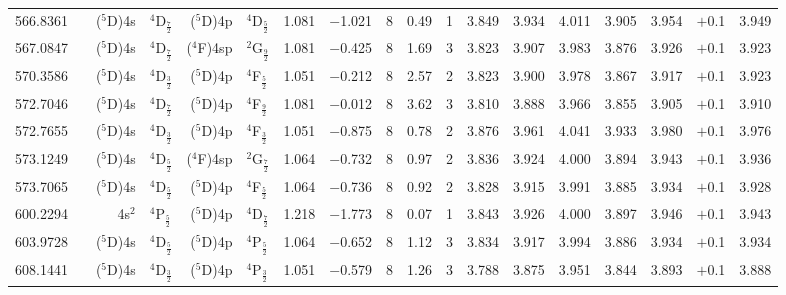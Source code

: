 \documentclass[traditabstract]{aa}
\newcommand{\pst}{\phantom{*}}
\newcommand{\phz}{\phantom{0}}
\begin{document}
\begin{center}
\begin{mpsupertabular}{r@{}c@{\ \ \ }r@{~}l@{\ }r@{~}l@{\ \ \ }c@{\ \ \ }c@{\ \ \ }c@{\ \ \ }c@{\ \ \ }c@{\ \ \ }c@{\ \ \ }c@{\ \ \ }c@{\ \ \ }c@{\ \ \ }c@{\ \ \ }r@{\ \ \ }c}
566.8361 & &  \footnotesize ($^5$D)4s&\footnotesize$^4$D$_\frac{7}{2}$   &\footnotesize ($^5$D)4p &\footnotesize$^4$D$_\frac{5}{2}$   & 1.081 & $-$1.021 & 8  & 0.49 & 1\pst      & 3.849 & 3.934 & 4.011 & 3.905 & 3.954 & \phz$+$0.1\phz & 3.949 \\  
567.0847 & &  \footnotesize ($^5$D)4s&\footnotesize$^4$D$_\frac{7}{2}$   &\footnotesize ($^4$F)4sp&\footnotesize$^2$G$_\frac{9}{2}$   & 1.081 & $-$0.425 & 8  & 1.69 & 3\pst      & 3.823 & 3.907 & 3.983 & 3.876 & 3.926 & \phz$+$0.1\phz & 3.923 \\  
570.3586 & &  \footnotesize ($^5$D)4s&\footnotesize$^4$D$_\frac{3}{2}$   &\footnotesize ($^5$D)4p &\footnotesize$^4$F$_\frac{5}{2}$   & 1.051 & $-$0.212 & 8  & 2.57 & 2\pst      & 3.823 & 3.900 & 3.978 & 3.867 & 3.917 & \phz$+$0.1\phz & 3.923 \\  
572.7046 & &  \footnotesize ($^5$D)4s&\footnotesize$^4$D$_\frac{7}{2}$   &\footnotesize ($^5$D)4p &\footnotesize$^4$F$_\frac{9}{2}$   & 1.081 & $-$0.012 & 8  & 3.62 & 3\pst      & 3.810 & 3.888 & 3.966 & 3.855 & 3.905 & \phz$+$0.1\phz & 3.910 \\ 
572.7655 & &  \footnotesize ($^5$D)4s&\footnotesize$^4$D$_\frac{3}{2}$   &\footnotesize ($^5$D)4p &\footnotesize$^4$F$_\frac{3}{2}$   & 1.051 & $-$0.875 & 8  & 0.78 & 2\pst      & 3.876 & 3.961 & 4.041 & 3.933 & 3.980 & \phz$+$0.1\phz & 3.976 \\  
573.1249 & &  \footnotesize ($^5$D)4s&\footnotesize$^4$D$_\frac{5}{2}$   &\footnotesize ($^4$F)4sp&\footnotesize$^2$G$_\frac{7}{2}$   & 1.064 & $-$0.732 & 8  & 0.97 & 2\pst      & 3.836 & 3.924 & 4.000 & 3.894 & 3.943 & \phz$+$0.1\phz & 3.936 \\  
573.7065 & &  \footnotesize ($^5$D)4s&\footnotesize$^4$D$_\frac{5}{2}$   &\footnotesize ($^5$D)4p &\footnotesize$^4$F$_\frac{5}{2}$   & 1.064 & $-$0.736 & 8  & 0.92 & 2\pst      & 3.828 & 3.915 & 3.991 & 3.885 & 3.934 & \phz$+$0.1\phz & 3.928 \\  
600.2294 & &  \footnotesize 4s$^2$   &\footnotesize$^4$P$_\frac{5}{2}$   &\footnotesize ($^5$D)4p &\footnotesize$^4$D$_\frac{7}{2}$   & 1.218 & $-$1.773 & 8  & 0.07 & 1\pst      & 3.843 & 3.926 & 4.000 & 3.897 & 3.946 & \phz$+$0.1\phz & 3.943 \\  
603.9728 & &  \footnotesize ($^5$D)4s&\footnotesize$^4$D$_\frac{5}{2}$   &\footnotesize ($^5$D)4p &\footnotesize$^4$P$_\frac{5}{2}$   & 1.064 & $-$0.652 & 8  & 1.12 & 3\pst      & 3.834 & 3.917 & 3.994 & 3.886 & 3.934 & \phz$+$0.1\phz & 3.934 \\  
608.1441 & &  \footnotesize ($^5$D)4s&\footnotesize$^4$D$_\frac{3}{2}$   &\footnotesize ($^5$D)4p &\footnotesize$^4$P$_\frac{3}{2}$   & 1.051 & $-$0.579 & 8  & 1.26 & 3\pst      & 3.788 & 3.875 & 3.951 & 3.844 & 3.893 & \phz$+$0.1\phz & 3.888 \\ 

\end{mpsupertabular}
\end{center}
\end{document}
